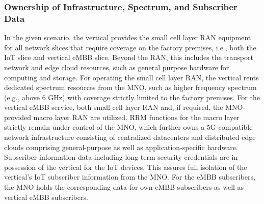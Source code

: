 \documentclass[a4paper,12pt]{report} %
\begin{document}
\subsubsection{Ownership of Infrastructure, Spectrum, and Subscriber Data}
In the given scenario, the vertical provides the small cell layer RAN equipment for all network slices
that require coverage on the factory premises, i.e., both the IoT slice and vertical eMBB slice. Beyond
the RAN, this includes the transport network and edge cloud resources, such as general purpose
hardware for computing and storage. For operating the small cell layer RAN, the vertical rents dedicated spectrum resources from the MNO, such as higher frequency spectrum (e.g., above 6 GHz)
with coverage strictly limited to the factory premises. For the vertical eMBB service, both small cell
layer RAN and, if required, the MNO‐provided macro layer RAN are utilized. \gls{RRM} functions for the
macro layer strictly remain under control of the MNO, which further owns a 5G‐compatible network infrastructure consisting of centralized datacenters and distributed edge clouds comprising general-purpose as well as application‐specific hardware.\\ Subscriber information data including long‐term security credentials are in possession of the vertical for the IoT devices. This assures full isolation of
the vertical’s IoT subscriber information from the MNO. For the eMBB subscribers, the MNO holds
the corresponding data for own eMBB subscribers as well as vertical eMBB subscribers.
\end{document}
